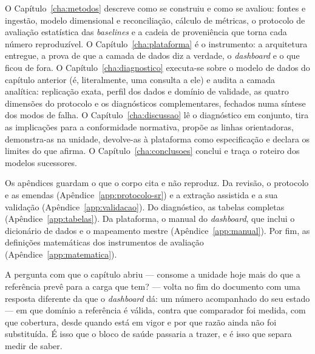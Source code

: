 O Capítulo~\ref{cha:metodos} descreve como se construiu e como se
avaliou: fontes e ingestão, modelo dimensional e reconciliação, cálculo
de métricas, o protocolo de avaliação estatística das \emph{baselines}
e a cadeia de proveniência que torna cada número reproduzível. O
Capítulo~\ref{cha:plataforma} é o instrumento: a arquitetura entregue,
a prova de que a camada de dados diz a verdade, o \emph{dashboard} e o
que ficou de fora. O Capítulo~\ref{cha:diagnostico} executa-se sobre o
modelo de dados do capítulo anterior (é, literalmente, uma consulta a
ele) e audita a camada analítica: replicação exata, perfil dos dados e
domínio de validade, as quatro dimensões do protocolo e os diagnósticos
complementares, fechados numa síntese dos modos de falha. O
Capítulo~\ref{cha:discussao} lê o diagnóstico em conjunto, tira as
implicações para a conformidade normativa, propõe as linhas
orientadoras, demonstra-as na unidade, devolve-as à plataforma como
especificação e declara os limites do que afirma. O
Capítulo~\ref{cha:conclusoes} conclui e traça o roteiro dos modelos
sucessores.


Os apêndices guardam o que o corpo cita e não reproduz. Da revisão, o
protocolo e as emendas (Apêndice~\ref{app:protocolo-sr}) e a extração
assistida e a sua validação (Apêndice~\ref{app:validacao}). Do diagnóstico,
as tabelas completas (Apêndice~\ref{app:tabelas}). Da plataforma, o manual
do \emph{dashboard}, que inclui o dicionário de dados e o mapeamento mestre
(Apêndice~\ref{app:manual}). Por fim, as definições matemáticas dos
instrumentos de avaliação (Apêndice~\ref{app:matematica}).

A pergunta com que o capítulo abriu --- consome a unidade hoje mais do
que a referência prevê para a carga que tem? --- volta no fim do
documento com uma resposta diferente da que o \emph{dashboard} dá: um
número acompanhado do seu estado --- em que domínio a referência é
válida, contra que comparador foi medida, com que cobertura, desde
quando está em vigor e por que razão ainda não foi substituída. É isso que o bloco de saúde passaria a trazer, e é isso que
separa medir de saber.
